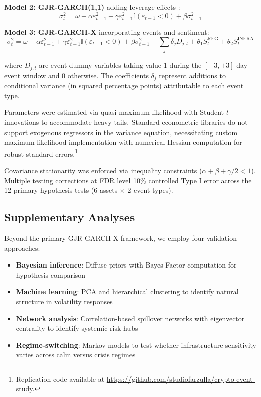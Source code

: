 \documentclass[pdflatex,sn-mathphys-num]{sn-jnl}
\theoremstyle{thmstyleone}
\theoremstyle{thmstyletwo}
\theoremstyle{thmstylethree}
\begin{document}
\textbf{Model 2: GJR-GARCH(1,1)} adding leverage effects \citep{GlostenEtAl1993}:
\begin{equation}
\sigma^2_t = \omega + \alpha \varepsilon^2_{t-1} + \gamma \varepsilon^2_{t-1} \mathbb{I}(\varepsilon_{t-1}<0) + \beta \sigma^2_{t-1}
\end{equation}

\textbf{Model 3: GJR-GARCH-X} incorporating events and sentiment:
\begin{equation}
\sigma^2_t = \omega + \alpha \varepsilon^2_{t-1} + \gamma \varepsilon^2_{t-1} \mathbb{I}(\varepsilon_{t-1}<0) + \beta \sigma^2_{t-1} + \sum_j \delta_j D_{j,t} + \theta_1 S_t^{\text{REG}} + \theta_2 S_t^{\text{INFRA}}
\end{equation}

where $D_{j,t}$ are event dummy variables taking value 1 during the $[-3,+3]$ day event window and 0 otherwise. The coefficients $\delta_j$ represent additions to conditional variance (in squared percentage points) attributable to each event type.

Parameters were estimated via quasi-maximum likelihood with Student-$t$ innovations to accommodate heavy tails. Standard econometric libraries do not support exogenous regressors in the variance equation, necessitating custom maximum likelihood implementation with numerical Hessian computation for robust standard errors.\footnote{Replication code available at \url{https://github.com/studiofarzulla/crypto-event-study}.}

Covariance stationarity was enforced via inequality constraints ($\alpha + \beta + \gamma/2 < 1$). Multiple testing corrections \citep{BenjaminiHochberg1995} at FDR level 10\% controlled Type I error across the 12 primary hypothesis tests (6 assets $\times$ 2 event types).

\subsection{Supplementary Analyses}

Beyond the primary GJR-GARCH-X framework, we employ four validation approaches:
\begin{itemize}[nosep]
\item \textbf{Bayesian inference}: Diffuse priors with Bayes Factor computation for hypothesis comparison
\item \textbf{Machine learning}: PCA and hierarchical clustering to identify natural structure in volatility responses
\item \textbf{Network analysis}: Correlation-based spillover networks with eigenvector centrality to identify systemic risk hubs
\item \textbf{Regime-switching}: Markov models to test whether infrastructure sensitivity varies across calm versus crisis regimes
\end{itemize}
\end{document}
